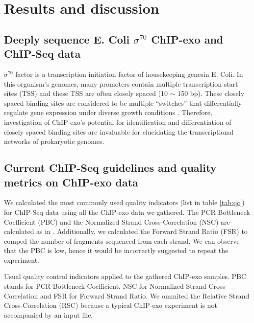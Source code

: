 \documentclass{bmcart}\usepackage[]{graphicx}\usepackage[]{color}
\newcommand{\sig}{\sigma^{70}}
\begin{document}
\section{Results and discussion}
\label{sec:results}

\subsection{Deeply sequence E. Coli $\sig$ ChIP-exo and ChIP-Seq data}
 
$\sig$ factor is a transcription initiation factor of housekeeping
genesin E. Coli. In this organism's genomes, many promoters contain
multiple transcription start sites (TSS) and these TSS are often
closely spaced (10 $\sim$ 150 bp). These closely spaced binding sites
are considered to be multiple ``switches'' that differentially
regulate gene expression under diverse growth conditions
\cite{regulondb}. Therefore, investigation of ChIP-exo's potential for
identification and differentiation of closely spaced binding sites are
invaluable for elucidating the transcriptional networks of prokaryotic
genomes.

\subsection{Current ChIP-Seq guidelines and quality metrics on ChIP-exo data}

We calculated the most commonly used quality indicators (list in table
\ref{tab:qc}) for ChIP-Seq data using all the ChIP-exo data we
gathered. The PCR Bottleneck Coefficient (PBC) and the Normalized
Strand Cross-Correlation (NSC) are calculated as in \cite{encode_qc}.
Additionally, we calculated the Forward Strand Ratio (FSR) to comped
the number of fragments sequenced from each strand. We can observe
that the PBC is low, hence it would be incorrectly suggested to repeat
the experiment.

\begin{table}[H]
  \centering
  \caption{Usual quality control indicators applied to the gathered ChIP-exo samples. 
    PBC stands for PCR Bottleneck Coefficient, NSC for Normalized Strand Cross-Correlation and
    FSR for Forward Strand Ratio. We ommited the Relative Strand Cross-Correlation (RSC) because
    a typical ChIP-exo experiment is not accompanied by an input file.}
  \label{tab:qc}
\end{table}




\end{document}
